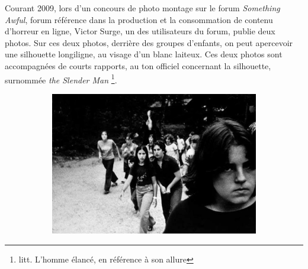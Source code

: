 \documentclass[12pt,a4paper,oneside,titlepage]{book} %
\begin{document}
Courant 2009, lors d'un concours de photo montage sur le forum \textit{Something Awful}, forum référence dans la production et la consommation de contenu d'horreur en ligne, Victor Surge, un des utilisateurs du forum, publie deux photos. Sur ces deux photos, derrière des groupes d'enfants, on peut apercevoir une silhouette longiligne, au visage d'un blanc laiteux. Ces deux photos sont accompagnées de courts rapports, au ton officiel concernant la silhouette, surnommée \textit{the Slender Man} \footnote{litt. L'homme élancé, en référence à son allure}. 


\begin{figure}[htbp]
    \centering
    \begin{subfigure}[b]{0.45\textwidth}
        \centering
        \includegraphics[width=\textwidth]{illustration/photos_slender.jpg}


\end{subfigure}
\end{figure}
\end{document}
